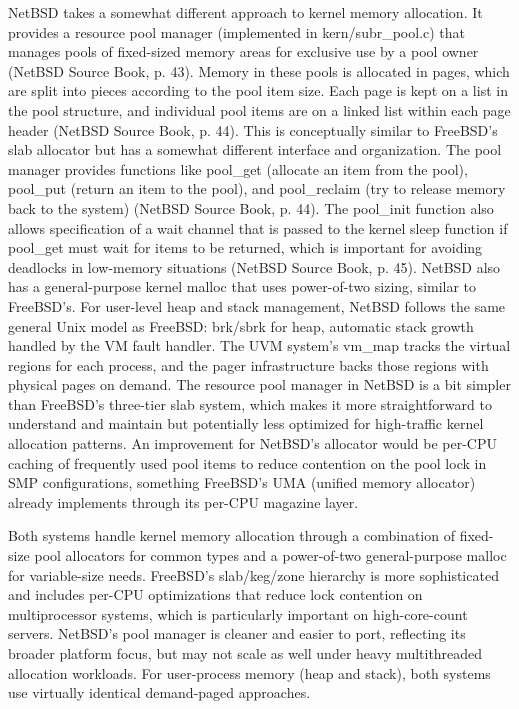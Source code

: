 NetBSD takes a somewhat different approach to kernel memory allocation. It provides a resource pool manager (implemented in kern/subr\_pool.c) that manages pools of fixed-sized memory areas for exclusive use by a pool owner (NetBSD Source Book, p. 43). Memory in these pools is allocated in pages, which are split into pieces according to the pool item size. Each page is kept on a list in the pool structure, and individual pool items are on a linked list within each page header (NetBSD Source Book, p. 44). This is conceptually similar to FreeBSD's slab allocator but has a somewhat different interface and organization.
The pool manager provides functions like pool\_get (allocate an item from the pool), pool\_put (return an item to the pool), and pool\_reclaim (try to release memory back to the system) (NetBSD Source Book, p. 44). The pool\_init function also allows specification of a wait channel that is passed to the kernel sleep function if pool\_get must wait for items to be returned, which is important for avoiding deadlocks in low-memory situations (NetBSD Source Book, p. 45). NetBSD also has a general-purpose kernel malloc that uses power-of-two sizing, similar to FreeBSD's.
For user-level heap and stack management, NetBSD follows the same general Unix model as FreeBSD: brk/sbrk for heap, automatic stack growth handled by the VM fault handler. The UVM system's vm\_map tracks the virtual regions for each process, and the pager infrastructure backs those regions with physical pages on demand.
The resource pool manager in NetBSD is a bit simpler than FreeBSD's three-tier slab system, which makes it more straightforward to understand and maintain but potentially less optimized for high-traffic kernel allocation patterns. An improvement for NetBSD's allocator would be per-CPU caching of frequently used pool items to reduce contention on the pool lock in SMP configurations, something FreeBSD's UMA (unified memory allocator) already implements through its per-CPU magazine layer.

Both systems handle kernel memory allocation through a combination of fixed-size pool allocators for common types and a power-of-two general-purpose malloc for variable-size needs. FreeBSD's slab/keg/zone hierarchy is more sophisticated and includes per-CPU optimizations that reduce lock contention on multiprocessor systems, which is particularly important on high-core-count servers. NetBSD's pool manager is cleaner and easier to port, reflecting its broader platform focus, but may not scale as well under heavy multithreaded allocation workloads. For user-process memory (heap and stack), both systems use virtually identical demand-paged approaches.

